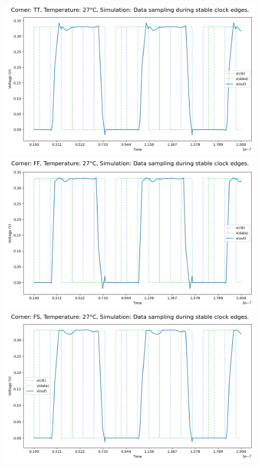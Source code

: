 \begin{figure}[H]
    \centering
    \includegraphics[height= 0.21\textheight]{figures/aimspice/TT/27/W2.csv.png}
    \vspace{5pt}
    \includegraphics[height= 0.21\textheight]{figures/aimspice/FF/27/W2.csv.png}
    \vspace{5pt}
    \includegraphics[height= 0.21\textheight]{figures/aimspice/FS/27/W2.csv.png}

\end{figure}
